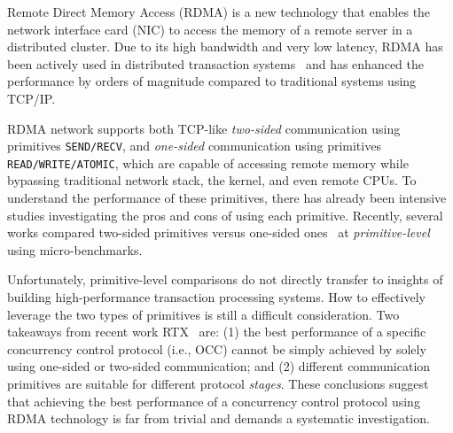 
Remote Direct Memory Access (RDMA) is a
new technology that enables the network interface card (NIC) to access the memory of a 
remote server in a distributed cluster. 
Due to its high bandwidth and very low
latency, RDMA has been actively used in distributed transaction systems~\cite{wei2015fast,kalia2016fasst,chen2016fast,dragojevic2015no} and has enhanced the performance by orders of magnitude compared to traditional systems using TCP/IP. 

RDMA network supports both TCP-like 
{\em two-sided} communication using primitives \texttt{SEND/RECV}, and
{\em one-sided} communication using 
primitives \texttt{READ/WRITE/ATOMIC},
which are capable of accessing remote memory while bypassing traditional network stack,
the kernel, and even remote CPUs. 
To understand the performance of these primitives, there has already been 
intensive studies investigating the 
pros and cons of using each primitive. 
Recently, several works compared two-sided primitives versus one-sided ones~\cite{kalia2014using,dragojevic2014farm,dragojevic2015no,wei2018deconstructing,tsai2017lite} at  {\em primitive-level} using micro-benchmarks. 



Unfortunately, primitive-level comparisons do not directly transfer to insights of
building high-performance transaction processing systems. 
How to effectively leverage the two types of primitives is still a difficult consideration. 
Two takeaways from recent work RTX~\cite{wei2018deconstructing} are: 
(1) the best performance of a specific concurrency control protocol (i.e., OCC) cannot be simply achieved by solely using one-sided or two-sided communication; and 
(2) different communication primitives 
are suitable for different protocol {\em stages}. 
These conclusions suggest 
that achieving the best performance of a concurrency control protocol using RDMA technology is far from trivial and demands a systematic investigation. 

